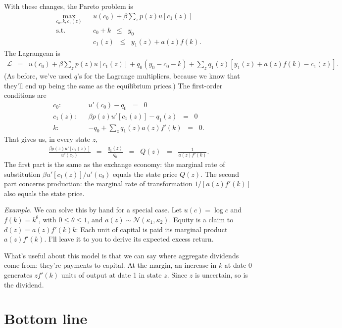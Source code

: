 \documentclass[11pt]{article}
\begin{document}
With these changes, the Pareto problem is
\begin{eqnarray*}
    \max_{c_0,k, c_1(z)} && u(c_0) + \beta \sum_z p(z) u[c_1(z)] \\
    \mbox{s.t.}   &&  c_0  + k \;\;\leq\;\; y_0 \\
                  &&  c_1(z) \;\;\leq\;\; y_1(z) + a(z) f(k) .
\end{eqnarray*}
The Lagrangean is
\begin{eqnarray*}
    \mathcal{L} &=&  u(c_0) + \beta \sum_z p(z) u[c_1(z)] + q_0 (y_0 - c_0 - k)
                    + \sum_z q_1(z)  [ y_1(z) + a(z) f(k) - c_1(z)]  .
\end{eqnarray*}
(As before, we've used $q$'s for the Lagrange multipliers,
because we know that they'll end up being the same as the equilibrium prices.)
The first-order conditions are
\begin{eqnarray*}
    c_0: &&  u'(c_0) - q_0 \;\;=\;\; 0 \\
    c_1(z): &&  \beta p(z) u'[c_1(z)] - q_1(z) \;\;=\;\; 0 \\
     k:   && - q_0 + \sum_z q_1(z) a(z) f'(k) \;\;=\;\; 0 .
\end{eqnarray*}
That gives us, in every state $z$,
\begin{eqnarray*}
    \frac{\beta p(z) u'[c_1(z)]}{u'(c_0)} &=& \frac{q_1(z)}{q_0}
    \;\;=\;\; Q(z)
    \;\;=\;\; \frac{1}{a(z) f'(k)} .
\end{eqnarray*}
The first part is the same as the exchange economy:
the marginal rate of substitution $\beta u'[c_1(z)]/u'(c_0)$
equals the state price $Q(z)$.
The second part concerns production:
the marginal rate of transformation $ 1 / [a(z) f'(k)]$ also equals the state price.

{\it Example.\/}
We can solve this by hand for a special case.
Let $u(c) = \log c$ and $f(k) = k^\theta$, with
$0 \leq \theta \leq 1$,
and $a(z) \sim \mathcal{N}(\kappa_1,\kappa_2)$.
Equity is a claim to $d(z) = a(z) f'(k) k$:
Each unit of capital is paid its marginal product $a(z) f'(k)$.
I'll leave it to you to derive its expected excess return.


What's useful about this model is that we can say where
aggregate dividends come from:
they're payments to capital.
At the margin,
an increase in $k$ at date 0 generates $z f'(k)$ units of
output at date 1 in state $z$.
Since $z$ is uncertain, so is the dividend.


\section*{Bottom line}
\end{document}
